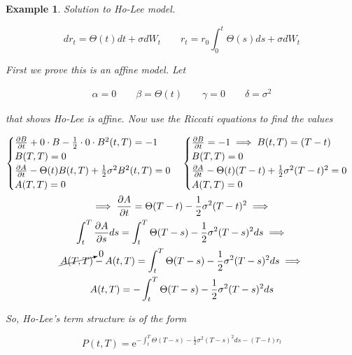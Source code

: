 \documentclass[oneside,titlepage,headinclude,12pt,a4paper,BCOR5mm,footinclude]{book}
\theoremstyle{defn}
\newtheorem{example}{Example}
\newcommand{\eexp}{\mathrm{e}}
\newcommand\de\partial
\begin{document}
\begin{example} Solution to Ho-Lee model.

  \[
    dr_t = \Theta(t)dt + \sigma dW_t \quad\quad r_t = r_0 \int_0^t \Theta(s)ds + \sigma dW_t
  \]

  First we prove this is an affine model. Let

  \begin{gather*}
    \alpha = 0 \quad\quad \beta = \Theta(t) \quad\quad \gamma = 0 \quad\quad \delta = \sigma^2
  \end{gather*}

  that shows Ho-Lee is affine. Now use the Riccati equations to find the values

  \begin{gather*}
    \begin{cases}
      \frac{\de B}{\de t} + 0 \cdot B -\frac{1}{2}\cdot0\cdot B^2(t,T) = -1 \\
      B(T,T) = 0 \\
      \frac{\de A}{\de t} - \Theta(t)B(t,T) + \frac{1}{2}\sigma^2B^2(t,T) = 0\\
      A(T,T) = 0
    \end{cases}
    \begin{cases}
      \frac{\de B}{\de t} = -1 \implies B(t,T) = (T-t) \\
      B(T,T) = 0 \\
      \frac{\de A}{\de t} - \Theta(t)(T-t) +\frac{1}{2}\sigma^2(T-t)^2 = 0\\
      A(T,T) = 0
    \end{cases} 
    \\
    \implies \frac{\de A}{\de t} = \Theta(T-t) - \frac{1}{2}\sigma^2(T-t)^2 \implies \\
    \int_t^T \frac{\de A}{\de s}ds = \int_t^T \Theta(T-s) - \frac{1}{2}\sigma^2(T-s)^2 ds \implies\\
    \cancelto{0}{A(T,T)} - A(t,T) = \int_t^T \Theta(T-s) - \frac{1}{2}\sigma^2(T-s)^2 ds \implies\\
    A(t,T) = -\int_t^T \Theta(T-s) - \frac{1}{2}\sigma^2(T-s)^2 ds
  \end{gather*}

  So, Ho-Lee's term structure is of the form

  \[
    P(t,T) = \eexp^{-\int_t^T \Theta(T-s) - \frac{1}{2}\sigma^2(T-s)^2 ds -(T-t)r_t}
  \]
\end{example}
\end{document}
